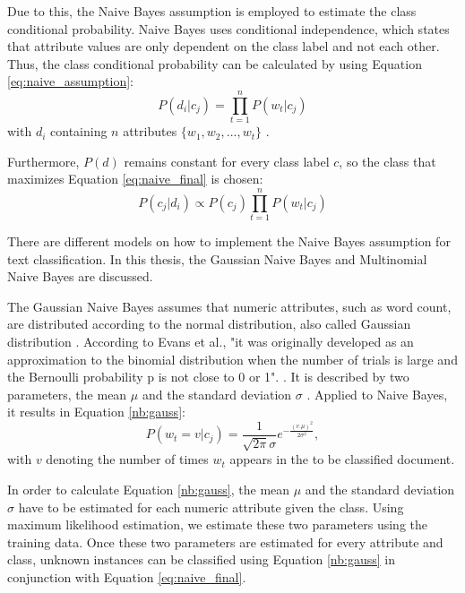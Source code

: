         Due to this, the Naive Bayes assumption is employed to estimate the class conditional probability. Naive Bayes uses conditional independence, which states that attribute values are only dependent on the class label and not each other. Thus, the class conditional probability can be calculated by using Equation \eqref{eq:naive_assumption}:
        \begin{equation}
            \label{eq:naive_assumption}
            P(d_i|c_j) = \prod_{t=1}^{n}P(w_{t}|c_j)
        \end{equation}
        with $d_i$ containing $n$ attributes $\{w_1,w_2,...,w_t\}$ \cite{DBLP:books/aw/TanSKK2019}.

        Furthermore, $P(d)$ remains constant for every class label $c$, so the class that maximizes Equation \eqref{eq:naive_final} is chosen: 
        \begin{equation}
            \label{eq:naive_final}
            P(c_j|d_i)\propto P(c_j)\prod_{t=1}^{n}P(w_{t}|c_j) 
        \end{equation}   
        
        
        There are different models on how to implement the Naive Bayes assumption for text classification. In this thesis, the Gaussian Naive Bayes and Multinomial Naive Bayes are discussed. 
        
        The Gaussian Naive Bayes assumes that numeric attributes, such as word count, are distributed according to the normal distribution, also called Gaussian distribution \cite{nb_gauss}. According to Evans et al., "it was originally developed as an approximation to the binomial distribution when the number of trials is large and the Bernoulli probability p is not close to 0 or 1". \cite[p.~143]{evans2011statistical}. It is described by two parameters, the mean $\mu$ and the standard deviation $\sigma$ \cite{evans2011statistical}. Applied to Naive Bayes, it results in Equation \eqref{nb:gauss}:
        \begin{equation}
        \label{nb:gauss}
            P(w_t = v|c_j) = \frac{1}{\sqrt{2\pi}\sigma}e^{-\frac{(v.\mu)^2}{2\sigma^2}},
        \end{equation}
        with $v$ denoting the number of times $w_t$ appears in the to be classified document.
        
        In order to calculate Equation \eqref{nb:gauss}, the mean $\mu$ and the standard deviation $\sigma$ have to be estimated for each numeric attribute given the class. Using maximum likelihood estimation, we estimate these two parameters using the training data. Once these two parameters are estimated for every attribute and class, unknown instances can be classified using Equation \eqref{nb:gauss} in conjunction with Equation \eqref{eq:naive_final}.
        
